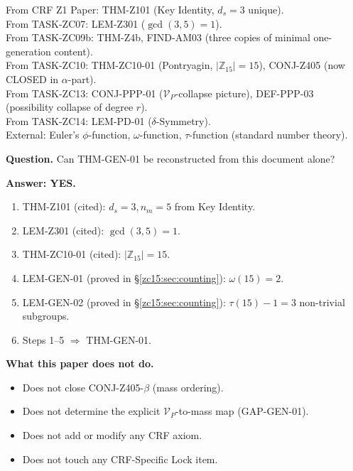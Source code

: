 \documentclass[12pt, a4paper]{article}
\begin{document}
\begin{formalbox}[title={Atomic units inherited (not modified)}]
From CRF Z1 Paper: THM-Z101 (Key Identity, $d_s=3$ unique).\\
From TASK-ZC07: LEM-Z301 ($\gcd(3,5)=1$). \\
From TASK-ZC09b: THM-Z4b, FIND-AM03 (three copies of minimal
  one-generation content). \\
From TASK-ZC10: THM-ZC10-01 (Pontryagin, $|\mathbb{Z}_{15}|=15$),
  CONJ-Z405 (now CLOSED in $\alpha$-part). \\
From TASK-ZC13: CONJ-PPP-01 ($\mathcal{V}_P$-collapse picture),
  DEF-PPP-03 (possibility collapse of degree $r$). \\
From TASK-ZC14: LEM-PD-01 ($\delta$-Symmetry). \\
External: Euler's $\phi$-function, $\omega$-function,
  $\tau$-function (standard number theory).
\end{formalbox}

\begin{formalbox}[title={Reconstruction Test (CUIP No-Loss)}]
\textbf{Question.} Can THM-GEN-01 be reconstructed from this
document alone?

\textbf{Answer: YES.}
\begin{enumerate}[leftmargin=*, noitemsep]
  \item THM-Z101 (cited): $d_s=3, n_m=5$ from Key Identity.
  \item LEM-Z301 (cited): $\gcd(3,5)=1$.
  \item THM-ZC10-01 (cited): $|\mathbb{Z}_{15}|=15$.
  \item LEM-GEN-01 (proved in \S\ref{zc15:sec:counting}): $\omega(15)=2$.
  \item LEM-GEN-02 (proved in \S\ref{zc15:sec:counting}):
    $\tau(15)-1=3$ non-trivial subgroups.
  \item Steps 1--5 $\Rightarrow$ THM-GEN-01.
\end{enumerate}

\textbf{What this paper does not do.}
\begin{itemize}[leftmargin=*, noitemsep]
  \item Does not close CONJ-Z405-$\beta$ (mass ordering).
  \item Does not determine the explicit $\mathcal{V}_P$-to-mass
    map (GAP-GEN-01).
  \item Does not add or modify any CRF axiom.
  \item Does not touch any CRF-Specific Lock item.
\end{itemize}
\end{formalbox}
\end{document}
